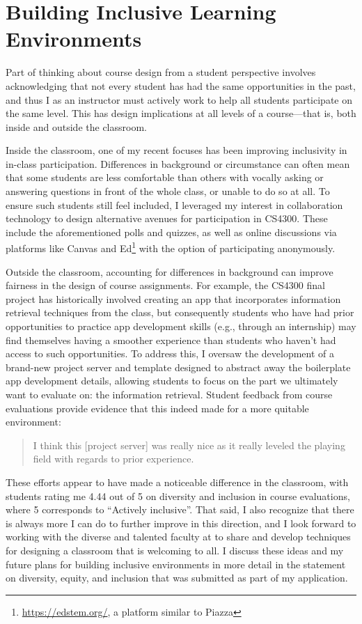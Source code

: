 \documentclass[12pt,letterpaper]{article}
\begin{document}
\section{Building Inclusive Learning Environments}
Part of thinking about course design from a student perspective involves acknowledging that not every student has had the same opportunities in the past, and thus I as an instructor must actively work to help all students participate on the same level.
This has design implications at all levels of a course---that is, both inside and outside the classroom.

Inside the classroom, one of my recent focuses has been improving inclusivity in in-class participation.
Differences in background or circumstance can often mean that some students are less comfortable than others with vocally asking or answering questions in front of the whole class, or unable to do so at all.
To ensure such students still feel included, I leveraged my interest in collaboration technology to design alternative avenues for participation in CS4300.
These include the aforementioned polls and quizzes, as well as online discussions via platforms like Canvas and Ed\footnote{\url{https://edstem.org/}, a platform similar to Piazza} with the option of participating anonymously.

Outside the classroom, accounting for differences in background can improve fairness in the design of course assignments.
For example, the CS4300 final project has historically involved creating an app that incorporates information retrieval techniques from the class, but consequently students who have had prior opportunities to practice app development skills (e.g., through an internship) may find themselves having a smoother experience than students who haven't had access to such opportunities.
To address this, I oversaw the development of a brand-new project server and template designed to abstract away the boilerplate app development details, allowing students to focus on the part we ultimately want to evaluate on: the information retrieval.
Student feedback from course evaluations provide evidence that this indeed made for a more quitable environment:
\begin{quote}
I think this [project server] was really nice as it really leveled the playing field with regards to prior experience.
\end{quote}

These efforts appear to have made a noticeable difference in the classroom, with students rating me 4.44 out of 5 on diversity and inclusion in course evaluations, where 5 corresponds to ``Actively inclusive''.
That said, I also recognize that there is always more I can do to further improve in this direction, and I look forward to working with the diverse and talented faculty at \schoolname to share and develop techniques for designing a classroom that is welcoming to all.
\iflongdei
I discuss these ideas and my future plans for building inclusive environments in more detail in the statement on diversity, equity, and inclusion that was submitted as part of my application.
\else
%
\fi
\end{document}
